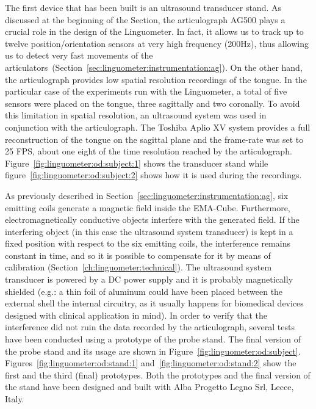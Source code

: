 The first device that has been built is an ultrasound transducer stand.
As discussed at the beginning of the Section, the articulograph AG500 plays a
crucial role in the design of the Linguometer. 
In fact, it allows us to track up to twelve position/orientation sensors at very high frequency (200Hz),
thus allowing us to detect very fast movements of the
articulators~(Section~\ref{sec:linguometer:instrumentation:ag}).
On the other hand, the articulograph provides low spatial resolution recordings
of the tongue.
In the particular case of the experiments run with the Linguometer, a total of 
five sensors were placed on the tongue, three sagittally and two coronally.
To avoid this limitation in spatial resolution, an ultrasound system was used 
in conjunction with the articulograph.
The Toshiba Aplio XV system provides a full reconstruction of the tongue on the
sagittal plane and the frame-rate was set to 25 FPS, about one eight of the time
resolution reached by the articulograph.
Figure~\ref{fig:linguometer:od:subject:1} shows the transducer stand
while figure~\ref{fig:linguometer:od:subject:2} shows how it is used during the
recordings.


As previously described in Section~\ref{sec:linguometer:instrumentation:ag},
six emitting coils generate a magnetic field inside the EMA-Cube.
Furthermore, electromagnetically conductive objects interfere with
the generated field.
If the interfering object (in this case the ultrasound system transducer) 
is kept in a fixed position
with respect to the six emitting coils, the interference
remains  constant in time, and so it is possible to compensate
for it by means of calibration (Section~\ref{ch:linguometer:technical}).
The ultrasound system transducer is powered by a DC power supply and it is
probably magnetically shielded (e.g.: a thin foil of aluminum could have been
placed between the external shell the internal circuitry, as it usually 
happens for biomedical devices designed with clinical application in mind).
In order to verify that the interference did not ruin the data recorded by 
the articulograph, several tests have been conducted using a prototype of the
probe stand.
The final version of the probe stand and its usage are shown in 
Figure~\ref{fig:linguometer:od:subject}.
Figures~\ref{fig:linguometer:od:stand:1} 
and~\ref{fig:linguometer:od:stand:2} show the first and the third (final)
prototypes.
Both the prototypes and the final version of the stand have been designed 
and built with Alba Progetto Legno Srl, Lecce, Italy. 

